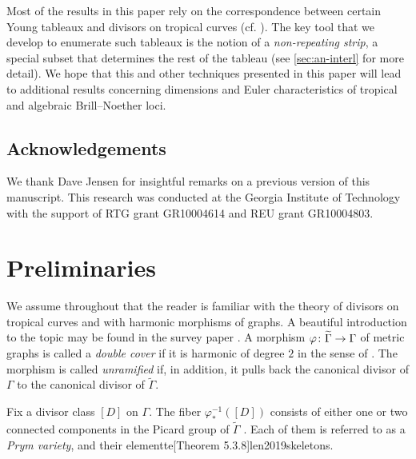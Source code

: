 \documentclass[11pt,reqno]{amsart}
\newcommand*{\maps}{\nobreak\mskip2mu\mathpunct{}\nonscript
  \mkern-\thinmuskip{:}\mskip6muplus1mu\relax}
\newcommand*{\wti}[1]{\widetilde{#1}}
\DeclareMathOperator{\Jac}{Jac}
\theoremstyle{definition}
\theoremstyle{problem}
\theoremstyle{plain}
\theoremstyle{remark}
\theoremstyle{theorem}
\numberwithin{equation}{section}
\numberwithin{figure}{section}
\theoremstyle{definition}
\theoremstyle{problem}
\theoremstyle{plain}
\begin{document}
Most of the results in this paper rely on the correspondence between certain Young tableaux and divisors on tropical curves (cf. \cite{CDPR, pflueger2017special}). The key tool that we develop to enumerate such tableaux is the notion of a \emph{non-repeating strip}, a special subset that determines the rest of the tableau (see \cref{sec:an-interl} for more detail).
We hope that this and  other techniques presented in this paper will lead to additional results concerning dimensions and Euler characteristics of tropical and algebraic Brill--Noether loci. 



       \subsection*{Acknowledgements} 
       We thank Dave Jensen for insightful remarks on a previous version of this manuscript. 
    This   research was conducted at the Georgia Institute of Technology
    with the support of RTG grant GR10004614 and REU grant
    GR10004803. 
    
\section{Preliminaries}\label{sec:preliminaries}
We assume throughout that the reader is familiar with the theory of
divisors on tropical curves and with harmonic morphisms of graphs. A
beautiful introduction to the topic may be found in the survey paper
\cite{BJ}.  A morphism $\varphi\maps\wti\Gamma\to\Gamma$ of metric
graphs is called a \emph{double cover} if it is harmonic of degree $2$
in the sense of \cite{ABBR15}. The morphism is called
\emph{unramified} if, in addition, it pulls back the canonical divisor
of $\Gamma$ to the canonical divisor of $\widetilde\Gamma$.



Fix a divisor class $[D]$ on $\Gamma$. The fiber
$\varphi^{-1}_{*}([D])$ consists of either one or two connected
components in the Picard group of $\widetilde\Gamma$ \cite[Proposition
6.1]{JL}. Each of them is referred to as a \emph{Prym variety}, and
their elementte[Theorem 5.3.8]{len2019skeletons}.
\end{document}
